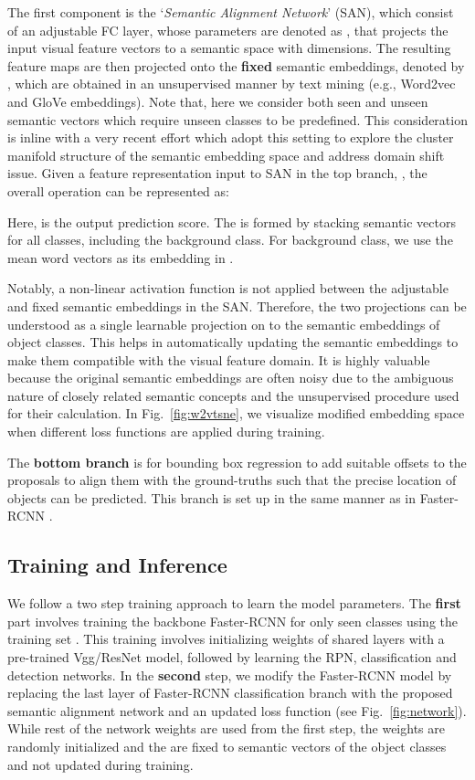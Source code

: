 \documentclass[runningheads]{llncs}
\begin{document}
The first component is the `\emph{Semantic Alignment Network}' (SAN), which consist of an adjustable FC layer, whose parameters are denoted as , that projects the input visual feature vectors to a semantic space with  dimensions. The resulting feature maps are then projected onto the \textbf{fixed} semantic embeddings, denoted by , which are obtained in an unsupervised manner by text mining (e.g., Word2vec and GloVe embeddings). Note that, here we consider both seen and unseen semantic vectors which require unseen classes to be predefined. This consideration is inline with a very recent effort \cite{Fu_PAMI_2017} which adopt this setting to explore the cluster manifold structure of the semantic embedding space and address domain shift issue.
Given a feature representation input to SAN in the top branch, , the overall operation can be represented as:
    
Here,  is the output prediction score. The  is formed by stacking semantic vectors for all classes, including the background class. For background class, we use the mean word vectors  as its embedding in . 

Notably, a non-linear activation function is not applied between the adjustable and fixed semantic embeddings in the SAN. Therefore, the two projections can be understood as a single learnable projection on to the semantic embeddings of object classes. This helps in automatically updating the semantic embeddings to make them compatible with the visual feature domain. It is highly valuable because the original semantic embeddings are often noisy due to the ambiguous nature of closely related semantic concepts and the unsupervised procedure used for their calculation. In Fig.~\ref{fig:w2vtsne}, we visualize modified embedding space when different loss functions are applied during training.

The \textbf{bottom branch} is for bounding box regression to add suitable offsets to the proposals to align them with the ground-truths such that the precise location of objects can be predicted. This branch is set up in the same manner as in Faster-RCNN \cite{Faster_RCNN_2017}.


\subsection{Training and Inference}\label{sec:training}
We follow a two step training approach to learn the model parameters. The \textbf{first} part involves training the backbone Faster-RCNN  for only seen classes using the training set . This training involves initializing weights of shared layers with a pre-trained Vgg/ResNet model, followed by learning the RPN, classification and detection networks. In the \textbf{second} step, we modify the Faster-RCNN model by replacing the last layer of Faster-RCNN classification branch with the proposed semantic alignment network and an updated loss function (see Fig.~\ref{fig:network}). While rest of the network weights are used from the first step, the weights  are randomly initialized and the  are fixed to semantic vectors of the object classes and not updated during training. 
\end{document}
